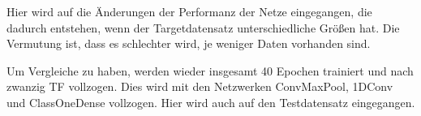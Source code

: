 Hier wird auf die Änderungen der Performanz der Netze eingegangen, die dadurch entstehen, wenn der Targetdatensatz unterschiedliche Größen hat. 
Die Vermutung ist, dass es schlechter wird, je weniger Daten vorhanden sind. 

Um Vergleiche zu haben, werden wieder insgesamt 40 Epochen trainiert und nach zwanzig TF vollzogen. Dies wird mit den Netzwerken 
ConvMaxPool, 1DConv und ClassOneDense vollzogen. Hier wird auch auf den Testdatensatz eingegangen. 

